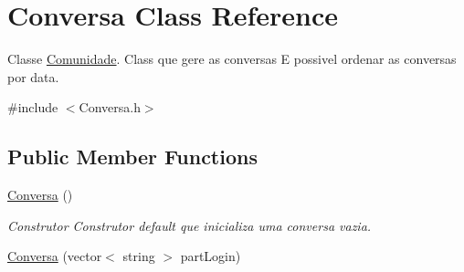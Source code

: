 \hypertarget{class_conversa}{}\section{Conversa Class Reference}
\label{class_conversa}


Classe \hyperlink{class_comunidade}{Comunidade}. Class que gere as conversas E possivel ordenar as conversas por data.  




{\ttfamily \#include $<$Conversa.\+h$>$}

\subsection*{Public Member Functions}
\begin{DoxyCompactItemize}
\item 
\hypertarget{class_conversa_ad8504a58d4ce78537bcf1e4abfd84b60}{}\hyperlink{class_conversa_ad8504a58d4ce78537bcf1e4abfd84b60}{Conversa} ()\label{class_conversa_ad8504a58d4ce78537bcf1e4abfd84b60}

\begin{DoxyCompactList}\small\item\em Construtor Construtor default que inicializa uma conversa vazia. \end{DoxyCompactList}\item 
\hypertarget{class_conversa_a00aae9cbb21f271ac1d6ba578ca820ec}{}\hyperlink{class_conversa_a00aae9cbb21f271ac1d6ba578ca820ec}{Conversa} (vector$<$ string $>$ part\+Login)\label{class_conversa_a00aae9cbb21f271ac1d6ba578ca820ec}


\end{DoxyCompactItemize}

